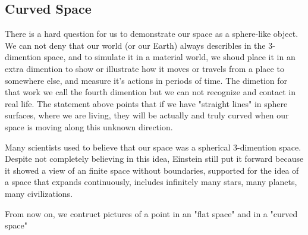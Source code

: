 \documentclass[11pt,a4paper]{article}
\begin{document}
	 \subsection{Curved Space}
	 There is a hard question for us to demonstrate our space as  a sphere-like object. We can not deny that our world (or our Earth) always describles in the 3-dimention space, and  to simulate it in a material world, we shoud place it in an extra dimention to show or illustrate how it moves or travels from a place to somewhere else, and measure it's actions in periods of time. The dimetion for that work we call the fourth dimention but we can not recognize and contact in real life. The statement above points that if we have "straight lines" in sphere surfaces, where we are living,  they will be actually  and truly curved  when our space is moving along this unknown direction. 
	 
	 Many scientists used to believe that our space was a spherical 3-dimention space. Despite not completely believing in this idea, Einstein still put it forward because it showed a view of  an finite space without boundaries, supported for the idea of  a space that expands continuously, includes infinitely  many stars, many planets,  many civilizations.
	 
	 From now on, we contruct pictures of  a point in an "flat space" and in a "curved space"
	 
\end{document}
